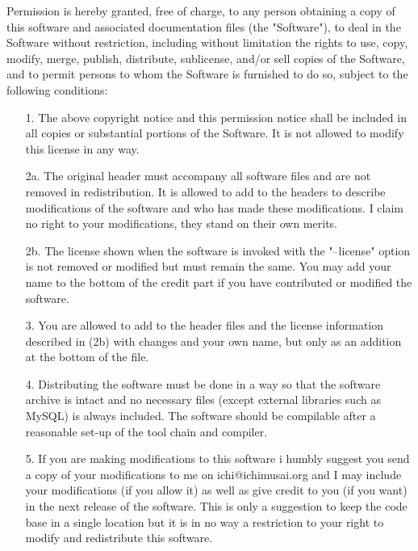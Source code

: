 \documentclass[english,twoside,openright,a4paper,12pt]{article}
\begin{document}
Permission is hereby granted, free of charge, to any person obtaining a copy of this software and associated documentation files (the "Software"), to deal in the Software without restriction, including without limitation the rights to use, copy, modify, merge, publish, distribute, sublicense, and/or sell copies of the Software, and to permit persons to whom the Software is furnished to do so, subject to the following conditions:

\begin{itemize}
\item[1.] The above copyright notice and this permission notice shall be included in all copies or substantial portions of the Software. It is not allowed to modify this license in any way.
  
\item[2a.] The original header must accompany all software files and are not removed in redistribution. It is allowed to add to the headers to describe modifications of the software and who has made these modifications. I claim no right to your modifications, they stand on their own merits.
 
\item[2b.] The license shown when the software is invoked with the "--license" option is not removed or modified but must remain the same. You may add your name to the bottom of the credit part if you have contributed or modified the software.
 
\item[3.] You are allowed to add to the header files and the license information described in (2b) with changes and your own name, but only as an addition at the bottom of the file.
 
\item[4.] Distributing the software must be done in a way so that the software archive is intact and no necessary files (except external libraries such as MySQL) is always included. The software should be compilable after a reasonable set-up of the tool chain and compiler.
 
\item[5.] If you are making modifications to this software i humbly suggest you send a copy of your modifications to me on ichi@ichimusai.org and I may include your modifications (if you allow it) as well as give credit to you (if you want) in the next release of the software. This is only a suggestion to keep the code base in a single location but it is in no way a restriction to your right to modify and redistribute this software.

\end{itemize}
\end{document}
